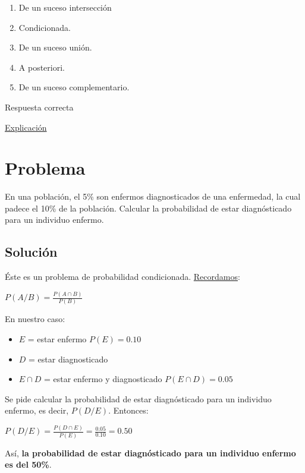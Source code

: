 \documentclass[
]{book}
\providecommand{\tightlist}{%
  \setlength{\itemsep}{0pt}\setlength{\parskip}{0pt}}
\begin{document}
\begin{enumerate}
\def\labelenumi{\alph{enumi})}
\tightlist
\item
  De un suceso intersección
\item
  Condicionada.
\item
  De un suceso unión.
\item
  A posteriori.
\item
  De un suceso complementario.
\end{enumerate}

Respuesta correcta

\href{https://es.wikipedia.org/wiki/Probabilidad_condicionada}{Explicación}

\hypertarget{problema-17}{%
\section{Problema}\label{problema-17}}

En una población, el 5\% son enfermos diagnosticados de una enfermedad, la cual padece el 10\% de la población. Calcular la probabilidad de estar diagnósticado para un individuo enfermo.

\hypertarget{soluciuxf3n-14}{%
\subsection{Solución}\label{soluciuxf3n-14}}

Éste es un problema de probabilidad condicionada. \href{https://es.wikipedia.org/wiki/Probabilidad_condicionada}{Recordamos}:

\(P(A/B)=\frac{P(A \cap B)}{P(B)}\)

En nuestro caso:

\begin{itemize}
\tightlist
\item
  \(E\) = estar enfermo \(P(E)=0.10\)
\item
  \(D\) = estar diagnosticado
\item
  \(E \cap D\) = estar enfermo y diagnosticado \(P(E \cap D) = 0.05\)
\end{itemize}

Se pide calcular la probabilidad de estar diagnósticado para un individuo enfermo, es decir, \(P(D/E)\). Entonces:

\(P(D/E)=\frac{P(D \cap E)}{P(E)}= \frac{0.05}{0.10}=0.50\)

Así, \textbf{la probabilidad de estar diagnósticado para un individuo enfermo es del 50\%}.
\end{document}
